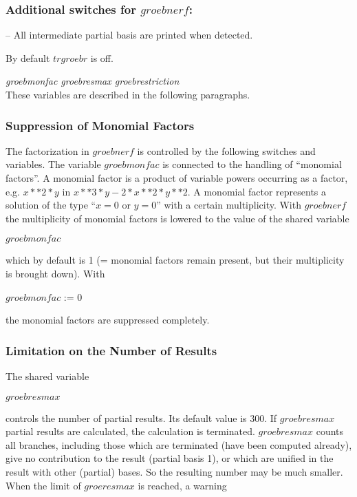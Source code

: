 \subsubsection*{Additional switches for $groebnerf$:}
\begin{description}

\item[$trgroebr$] -- All intermediate partial basis are printed when
detected.

By default $trgroebr$ is off.
\end{description}
{\it groebmonfac  groebresmax  groebrestriction} \\
\hspace*{.5cm} These variables are described in the following
paragraphs.

\subsubsection{Suppression of Monomial Factors}
The factorization in $groebnerf$ is controlled by the following
switches and variables.  The variable $groebmonfac$ is connected to
the handling of ``monomial factors''.  A monomial factor is a product
of variable powers occurring as a factor, e.g. $ x**2*y$  in  $x**3*y -
2*x**2*y**2$.  A monomial factor represents a solution of the type
``$ x = 0$  or  $y = 0$'' with a certain multiplicity.  With
$groeb$\-$nerf$ 
the multiplicity of monomial factors is lowered to the value of the
shared variable
\begin{center}
$groebmonfac$
\end{center}
which by default is 1 (= monomial factors remain present, but their
multiplicity is brought down). With
\begin{center}
$groebmonfac$ := 0
\end{center}
the monomial factors are suppressed completely.

\subsubsection{Limitation on the Number of Results}
The shared variable
\begin{center}
$groebresmax$
\end{center}
controls the number of partial results. Its default value is 300. If
$groebresmax$ partial results are calculated, the calculation is
terminated. $groebresmax$ counts all branches, including those which
are terminated (have been computed already), give no contribution to
the result (partial basis 1), or which are unified in the result with
other (partial) bases. So the resulting number may be much smaller.
When the limit of $groeresmax$ is reached, a warning

